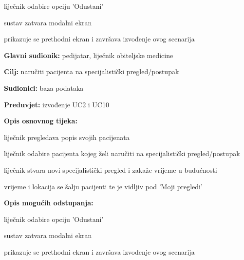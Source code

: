 \begin{packed_item}
\begin{packed_item}
							\item[5.b] liječnik odabire opciju 'Odustani'
							\item [] \begin{packed_enum}
								\item sustav zatvara modalni ekran
								\item prikazuje se prethodni ekran i završava izvođenje ovog scenarija
							\end{packed_enum}
							
						\end{packed_item}
					\end{packed_item}

     
                    \noindent {}
					\begin{packed_item}
	
						\item \textbf{Glavni sudionik: }pedijatar, liječnik obiteljske medicine
						\item  \textbf{Cilj:} naručiti pacijenta na specijalistički pregled/postupak
						\item  \textbf{Sudionici:} baza podataka
						\item  \textbf{Preduvjet:} izvođenje UC2 i UC10
						\item  \textbf{Opis osnovnog tijeka:}
						
						\item[] \begin{packed_enum}
							
							\item liječnik pregledava popis svojih pacijenata
							\item liječnik odabire pacijenta kojeg želi naručiti na specijalistički pregled/postupak
							\item liječnik stvara novi specijalistički pregled i zakaže vrijeme u budućnosti
                            \item vrijeme i lokacija se šalju pacijenti te je vidljiv pod 'Moji pregledi'

						\end{packed_enum}
						\item  \textbf{Opis mogućih odstupanja:}
						
						\item[] \begin{packed_item}
	
							\item[5.a] liječnik odabire opciju 'Odustani'
							\item [] \begin{packed_enum}
								\item sustav zatvara modalni ekran
								\item prikazuje se prethodni ekran i završava izvođenje ovog scenarija
							\end{packed_enum}
						\end{packed_item}
					\end{packed_item}


